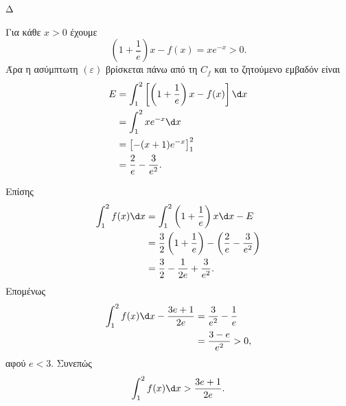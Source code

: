 \begin{thema}{Δ}
\begin{erwthma}
\item Για κάθε $x>0$ έχουμε
\[
\left(1+\frac{1}{e}\right)x-f(x)=xe^{-x}>0.
\]
Άρα η ασύμπτωτη $(\varepsilon)$ βρίσκεται πάνω από τη $C_f$ και το ζητούμενο εμβαδόν είναι
\begin{align*}
E
&=\int_1^2
\left[
\left(1+\frac{1}{e}\right)x-f(x)
\right]\d x\\
&=\int_1^2xe^{-x}\d x\\
&=\left[-(x+1)e^{-x}\right]_1^2\\
&={\frac{2}{e}-\frac{3}{e^2}}.
\end{align*}

Επίσης
\begin{align*}
\int_1^2f(x)\d x
&=\int_1^2
\left(1+\frac{1}{e}\right)x\d x-E\\
&=\frac{3}{2}\left(1+\frac{1}{e}\right)
-\left(\frac{2}{e}-\frac{3}{e^2}\right)\\
&=\frac{3}{2}-\frac{1}{2e}+\frac{3}{e^2}.
\end{align*}
Επομένως
\begin{align*}
\int_1^2f(x)\d x-\frac{3e+1}{2e}
&=\frac{3}{e^2}-\frac{1}{e}\\
&=\frac{3-e}{e^2}>0,
\end{align*}
αφού $e<3$. Συνεπώς
\[
{
\int_1^2f(x)\d x>\frac{3e+1}{2e}}.
\]
\end{erwthma}
\end{thema}

